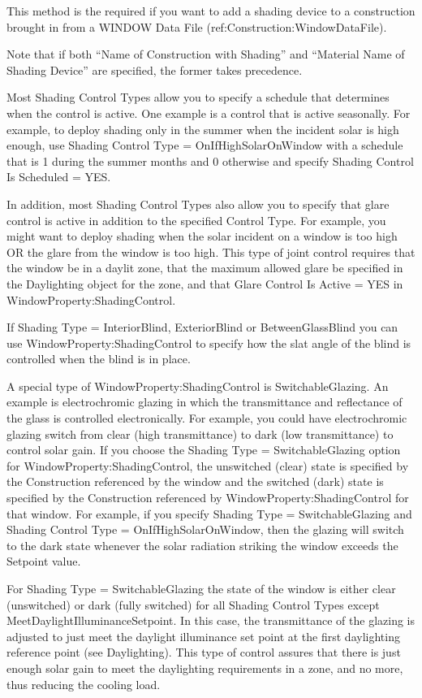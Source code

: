 \begin{itemize}
This method is the required if you want to add a shading device to a construction brought in from a WINDOW Data File (ref:Construction:WindowDataFile).

Note that if both ``Name of Construction with Shading'' and ``Material Name of Shading Device'' are specified, the former takes precedence.
\end{itemize}

Most Shading Control Types allow you to specify a schedule that determines when the control is active. One example is a control that is active seasonally. For example, to deploy shading only in the summer when the incident solar is high enough, use Shading Control Type = OnIfHighSolarOnWindow with a schedule that is 1 during the summer months and 0 otherwise and specify Shading Control Is Scheduled = YES.

In addition, most Shading Control Types also allow you to specify that glare control is active in addition to the specified Control Type. For example, you might want to deploy shading when the solar incident on a window is too high OR the glare from the window is too high. This type of joint control requires that the window be in a daylit zone, that the maximum allowed glare be specified in the Daylighting object for the zone, and that Glare Control Is Active = YES in WindowProperty:ShadingControl.

If Shading Type = InteriorBlind, ExteriorBlind or BetweenGlassBlind you can use WindowProperty:ShadingControl to specify how the slat angle of the blind is controlled when the blind is in place.

A special type of WindowProperty:ShadingControl is SwitchableGlazing. An example is electrochromic glazing in which the transmittance and reflectance of the glass is controlled electronically. For example, you could have electrochromic glazing switch from clear (high transmittance) to dark (low transmittance) to control solar gain. If you choose the Shading Type = SwitchableGlazing option for WindowProperty:ShadingControl, the unswitched (clear) state is specified by the Construction referenced by the window and the switched (dark) state is specified by the Construction referenced by WindowProperty:ShadingControl for that window. For example, if you specify Shading Type = SwitchableGlazing and Shading Control Type = OnIfHighSolarOnWindow, then the glazing will switch to the dark state whenever the solar radiation striking the window exceeds the Setpoint value.

For Shading Type = SwitchableGlazing the state of the window is either clear (unswitched) or dark (fully switched) for all Shading Control Types except MeetDaylightIlluminanceSetpoint. In this case, the transmittance of the glazing is adjusted to just meet the daylight illuminance set point at the first daylighting reference point (see Daylighting). This type of control assures that there is just enough solar gain to meet the daylighting requirements in a zone, and no more, thus reducing the cooling load.

